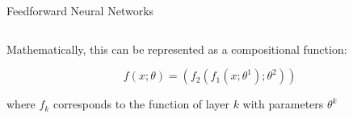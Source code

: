 \begin{frame}[t]{Feedforward Neural Networks}
\begin{columns}
\begin{column}{0.6\textwidth}
{    \begin{blackbox}
        Mathematically, this can be represented as a compositional function:

        \[
        f(x; \theta) = (f_2(f_1(x; \theta^1); \theta^2))
        \]

        where $f_k$ corresponds to the function of layer $k$ with parameters $\theta^k$ 
    \end{blackbox}
    }
    \end{column}
\end{columns}
    
\end{frame}



    

